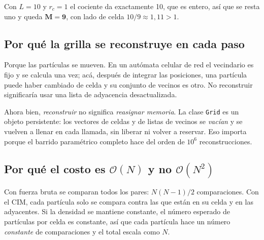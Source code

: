 \documentclass[11pt]{article}
\begin{document}
Con $L = 10$ y $r_c = 1$ el cociente da exactamente 10, que es entero, así que
se resta uno y queda $\mathbf{M = 9}$, con lado de celda
$10/9 \approx 1{,}11 > 1$.


\subsection{Por qué la grilla se reconstruye en cada paso}

Porque las partículas se mueven. En un autómata celular de red el vecindario es
fijo y se calcula una vez; acá, después de integrar las posiciones, una
partícula puede haber cambiado de celda y su conjunto de vecinos es otro. No
reconstruir significaría usar una lista de adyacencia desactualizada.

Ahora bien, \emph{reconstruir} no significa \emph{reasignar memoria}. La clase
\texttt{Grid} es un objeto persistente: los vectores de celdas y de listas de
vecinos se \emph{vacían} y se vuelven a llenar en cada llamada, sin liberar ni
volver a reservar. Eso importa porque el barrido paramétrico completo hace del
orden de $10^6$ reconstrucciones.


\subsection{Por qué el costo es $\mathcal{O}(N)$ y no $\mathcal{O}(N^2)$}

Con fuerza bruta se comparan todos los pares: $N(N-1)/2$ comparaciones. Con el
CIM, cada partícula solo se compara contra las que están en su celda y en las
adyacentes. Si la densidad se mantiene constante, el número esperado de
partículas por celda es constante, así que cada partícula hace un número
\emph{constante} de comparaciones y el total escala como $N$.
\end{document}

